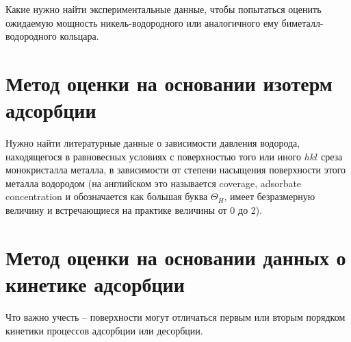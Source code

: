 \documentclass[11pt,a4paper]{article}
\begin{document}
Какие нужно найти экспериментальные данные, чтобы попытаться оценить ожидаемую мощность никель-водородного или аналогичного ему биметалл-водородного кольцара.

\section{Метод оценки на основании изотерм адсорбции}

Нужно найти литературные данные о зависимости давления водорода, находящегося в равновесных условиях с поверхностью того или иного $hkl$ среза монокристалла металла, в зависимости от степени насыщения поверхности этого металла водородом (на английском это называется coverage, adsorbate concentration и обозначается как большая буква $\Theta_H$, имеет безразмерную величину и встречающиеся на практике величины от 0 до 2).

\section{Метод оценки на основании данных о кинетике адсорбции}

Что важно учесть -- поверхности могут отличаться первым или вторым порядком кинетики процессов адсорбции или десорбции.
\end{document}
